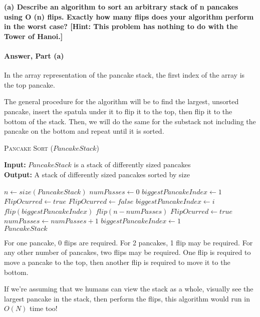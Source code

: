 \documentclass{article}
\begin{document}
{\bf (a) Describe an algorithm to sort an arbitrary stack of n pancakes using
O (n) flips. Exactly how many flips does your algorithm perform in the
worst case? [Hint: This problem has nothing to do with the Tower of
Hanoi.]}

\paragraph{Answer, Part (a)}

In the array representation of the pancake stack, the first index of the array
is the top pancake.

The general procedure for the algorithm will be to find the largest, unsorted pancake,
insert the spatula under it to flip it to the top, then flip it to the bottom of the stack.
Then, we will do the same for the substack not including the pancake on the bottom and repeat until it is sorted.

\begin{algorithm} \caption{\textsc{Pancake Sort} ($PancakeStack$)}\label{alg:seb}
    {\bf Input:} $PancakeStack$ is a stack of differently sized pancakes\\
    {\bf Output:} A stack of differently sized pancakes sorted by size
    \begin{algorithmic}[1]
        \State$n \gets size(PancakeStack)$
        \State$numPasses \gets 0$
        \State$biggestPancakeIndex \gets 1$
        \State$FlipOcurred \gets true$
        \State$FlipOcurred \gets false$
        \State$biggestPancakeIndex \gets i$
        \EndIf{}
        \EndFor{}
        \State$flip(biggestPancakeIndex)$
        \State$flip(n - numPasses)$
        \State$FlipOcurred \gets true$
        \EndIf{}
        \State$ numPasses \gets numPasses + 1$
        \State$biggestPancakeIndex \gets 1$
        \EndWhile{}\\
        \Return$PancakeStack$
    \end{algorithmic}
\end{algorithm}

For one pancake, 0 flips are required. For 2 pancakes, 1 flip may be required. For any other number of pancakes,
two flips may be required. One flip is required to move a pancake to the top, then another flip is required to
move it to the bottom.

If we're assuming that we humans can view the stack as a whole, visually see the largest pancake in the stack,
then perform the flips, this algorithm would run in $O (N)$ time too!
\end{document}
